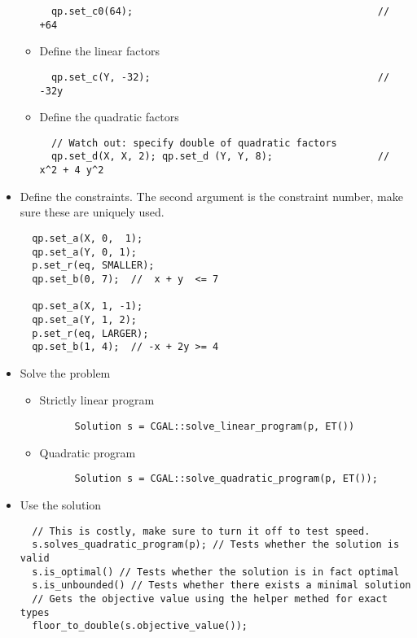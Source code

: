 \documentclass[guide.tex]{subfiles}
\begin{document}
\begin{itemize}
\begin{itemize}
\begin{verbatim}
  qp.set_c0(64);                                          // +64
\end{verbatim}
    \item  Define the linear factors
\begin{verbatim}
  qp.set_c(Y, -32);                                       // -32y
\end{verbatim}
    \item Define the quadratic factors
\begin{verbatim}
  // Watch out: specify double of quadratic factors
  qp.set_d(X, X, 2); qp.set_d (Y, Y, 8);                  // x^2 + 4 y^2
\end{verbatim}
  \end{itemize}
  \item Define the constraints. The second argument is the constraint number, make sure these are uniquely used.
\begin{verbatim}
  qp.set_a(X, 0,  1);
  qp.set_a(Y, 0, 1);
  p.set_r(eq, SMALLER);
  qp.set_b(0, 7);  //  x + y  <= 7

  qp.set_a(X, 1, -1);
  qp.set_a(Y, 1, 2);
  p.set_r(eq, LARGER);
  qp.set_b(1, 4);  // -x + 2y >= 4
\end{verbatim}
  \item Solve the problem
    \begin{itemize}
      \item Strictly linear program
\begin{verbatim}
      Solution s = CGAL::solve_linear_program(p, ET())
\end{verbatim}
      \item Quadratic program
\begin{verbatim}
      Solution s = CGAL::solve_quadratic_program(p, ET());
\end{verbatim}
    \end{itemize}
  \item Use the solution
\begin{verbatim}
  // This is costly, make sure to turn it off to test speed.
  s.solves_quadratic_program(p); // Tests whether the solution is valid
  s.is_optimal() // Tests whether the solution is in fact optimal
  s.is_unbounded() // Tests whether there exists a minimal solution
  // Gets the objective value using the helper methed for exact types
  floor_to_double(s.objective_value());
\end{verbatim}
\end{itemize}
\end{document}
